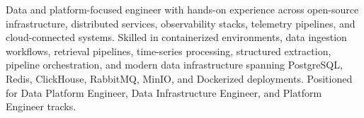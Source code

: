 Data and platform-focused engineer with hands-on experience across open-source infrastructure, distributed services, observability stacks, telemetry pipelines, and cloud-connected systems. Skilled in containerized environments, data ingestion workflows, retrieval pipelines, time-series processing, structured extraction, pipeline orchestration, and modern data infrastructure spanning PostgreSQL, Redis, ClickHouse, RabbitMQ, MinIO, and Dockerized deployments. Positioned for Data Platform Engineer, Data Infrastructure Engineer, and Platform Engineer tracks.

